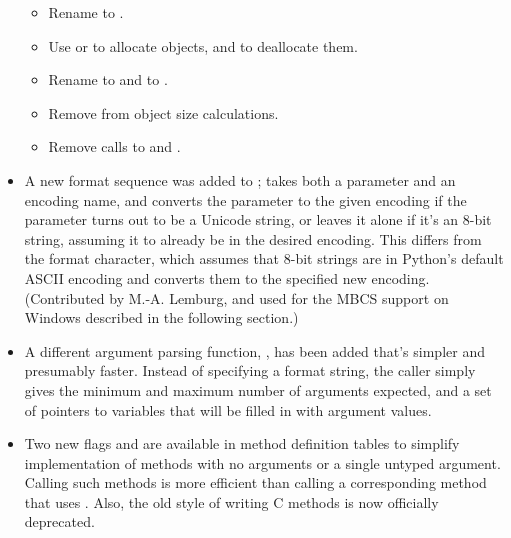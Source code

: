 \documentclass{howto}
\begin{document}
\begin{itemize}
\begin{itemize}

\item Rename  to .

\item Use  or  to
allocate objects, and  to deallocate them.

\item Rename  to  and
 to .

\item Remove  from object size calculations.

\item Remove calls to  and .

\end{itemize}

  \item A new  format sequence was added to
  ;  takes both a parameter and
  an encoding name, and converts the parameter to the given encoding
  if the parameter turns out to be a Unicode string, or leaves it
  alone if it's an 8-bit string, assuming it to already be in the
  desired encoding.  This differs from the  format character,
  which assumes that 8-bit strings are in Python's default ASCII
  encoding and converts them to the specified new encoding.
  (Contributed by M.-A. Lemburg, and used for the MBCS support on
  Windows described in the following section.)

  \item A different argument parsing function,
  , has been added that's simpler and
  presumably faster.  Instead of specifying a format string, the
  caller simply gives the minimum and maximum number of arguments
  expected, and a set of pointers to  variables that
  will be filled in with argument values.  

  \item Two new flags  and  are
   available in method definition tables to simplify implementation of
   methods with no arguments or a single untyped argument. Calling
   such methods is more efficient than calling a corresponding method
   that uses . 
   Also, the old  style of writing C methods is 
   now officially deprecated.  


\end{itemize}
\end{document}
